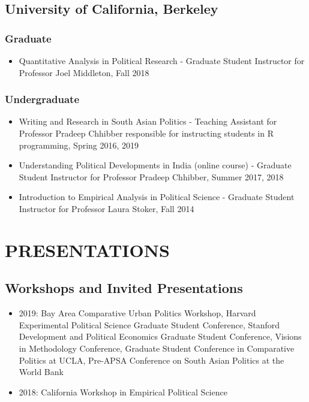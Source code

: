 \documentclass[11pt]{article}
\begin{document}
\subsection*{University of California, Berkeley}
\subsubsection*{Graduate}
\begin{itemize}
	\item[]Quantitative Analysis in Political Research - Graduate Student Instructor for Professor Joel Middleton, Fall 2018 
\end{itemize}
\subsubsection*{Undergraduate}
\begin{itemize}
		\item[]Writing and Research in South Asian Politics - Teaching Assistant for Professor Pradeep Chhibber responsible for instructing students in \textsf{R} programming, Spring 2016, 2019
	\item[]Understanding Political Developments in India (online course) - Graduate Student Instructor for Professor Pradeep Chhibber, Summer 2017, 2018
	\item[]Introduction to Empirical Analysis in Political Science - Graduate Student Instructor for Professor Laura Stoker, Fall 2014	
\end{itemize}

\vspace{3mm}
\section*{PRESENTATIONS}
\subsection*{Workshops and Invited Presentations}
\begin{itemize}[nosep]
\item[] 2019: Bay Area Comparative Urban Politics Workshop, Harvard Experimental Political Science Graduate Student Conference, Stanford Development and Political Economics Graduate Student Conference, Visions in Methodology Conference, Graduate Student Conference in Comparative Politics at UCLA, Pre-APSA Conference on South Asian Politics at the World Bank 


\item[] 2018: California Workshop in Empirical Political Science
\end{itemize}
\end{document}
